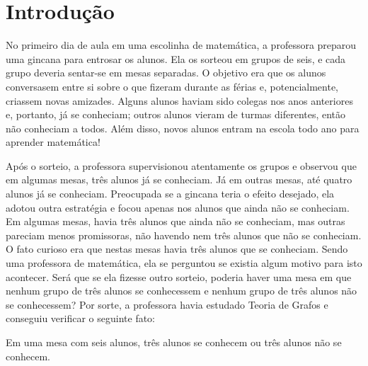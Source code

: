 
\chapter{Introdução}
\label{chap:intro}


No primeiro dia de aula em uma escolinha de matemática, a professora preparou uma gincana para entrosar os alunos. Ela os sorteou em grupos de seis, e cada grupo deveria sentar-se em mesas separadas. O objetivo era que os alunos conversasem entre si sobre o que fizeram durante as férias e, potencialmente, criassem novas amizades. Alguns alunos haviam sido colegas nos anos anteriores e, portanto, já se conheciam; outros alunos vieram de turmas diferentes, então não conheciam a todos. Além disso, novos alunos entram na escola todo ano para aprender matemática!

Após o sorteio, a professora supervisionou atentamente os grupos e observou que em algumas mesas, três alunos já se conheciam. Já em outras mesas, até quatro alunos já se conheciam. Preocupada se a gincana teria o efeito desejado, ela adotou outra estratégia e focou apenas nos alunos que ainda não se conheciam. Em algumas mesas, havia três alunos que ainda não se conheciam, mas outras pareciam menos promissoras, não havendo nem três alunos que não se conheciam. O fato curioso era que nestas mesas havia três alunos que se conheciam. Sendo uma professora de matemática, ela se perguntou se existia algum motivo para isto acontecer. Será que se ela fizesse outro sorteio, poderia haver uma mesa em que nenhum grupo de três alunos se conhecessem e nenhum grupo de três alunos não se conhecessem? Por sorte, a professora havia estudado Teoria de Grafos e conseguiu verificar o seguinte fato:

\begin{fact} \label{fact:intro:ramsey}
Em uma mesa com seis alunos, três alunos se conhecem ou três alunos não se conhecem.
\end{fact}

